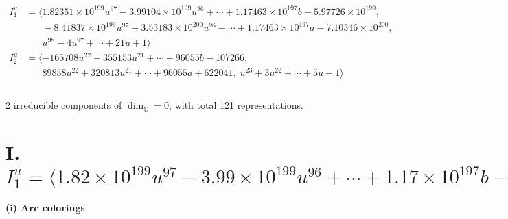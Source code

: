 \documentclass[1p]{elsarticle_modified}
\theoremstyle{definition}
\begin{document}
\begin{align*}
I^u_{1}&=\langle 
1.82351\times10^{199} u^{97}-3.99104\times10^{199} u^{96}+\cdots+1.17463\times10^{197} b-5.97726\times10^{199},\\
\phantom{I^u_{1}}&\phantom{= \langle  }-8.41837\times10^{199} u^{97}+3.53183\times10^{200} u^{96}+\cdots+1.17463\times10^{197} a-7.10346\times10^{200},\\
\phantom{I^u_{1}}&\phantom{= \langle  }u^{98}-4 u^{97}+\cdots+21 u+1\rangle \\
I^u_{2}&=\langle 
-165708 u^{22}-355153 u^{21}+\cdots+96055 b-107266,\\
\phantom{I^u_{2}}&\phantom{= \langle  }89858 u^{22}+320813 u^{21}+\cdots+96055 a+622041,\;u^{23}+3 u^{22}+\cdots+5 u-1\rangle \\
\\
\end{align*}
\raggedright * 2 irreducible components of $\dim_{\mathbb{C}}=0$, with total 121 representations.\\
\newpage
\renewcommand{\arraystretch}{1}
\centering \section*{I. $I^u_{1}= \langle 1.82\times10^{199} u^{97}-3.99\times10^{199} u^{96}+\cdots+1.17\times10^{197} b-5.98\times10^{199},\;-8.42\times10^{199} u^{97}+3.53\times10^{200} u^{96}+\cdots+1.17\times10^{197} a-7.10\times10^{200},\;u^{98}-4 u^{97}+\cdots+21 u+1 \rangle$}
\flushleft \textbf{(i) Arc colorings}\\
\end{document}

